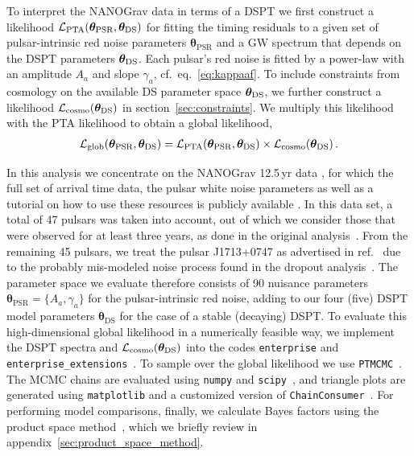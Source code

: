 To interpret the \ac{NANOGrav} data in terms of a \ac{DSPT} we first construct a likelihood $\mathcal{L}_\text{PTA}(\bm{\theta}_\text{PSR}, \bm{\theta}_{\text{DS}})$ for fitting the timing residuals to a given set of pulsar-intrinsic red noise parameters $\bm{\theta}_\text{PSR}$ and a \ac{GW} spectrum that depends on the \ac{DSPT} parameters $\bm{\theta}_{\text{DS}}$. Each pulsar's  red noise is fitted by a power-law with an amplitude $A_{a}$ and slope $\gamma_{a}$, cf.~eq.~\eqref{eq:kappaaf}. To include constraints from  cosmology on the available \ac{DS} parameter space $\bm{\theta}_{\text{DS}}$, we further construct a likelihood $\mathcal{L}_\text{cosmo}(\bm{\theta}_{\text{DS}})$ in section~\ref{sec:constraints}. We multiply this likelihood with the PTA 
likelihood to obtain a global likelihood,
\begin{align}
	\mathcal{L}_\text{glob}(\bm{\theta}_\text{PSR}, \bm{\theta}_\text{DS}) = \mathcal{L}_\text{PTA}(\bm{\theta}_\text{PSR}, \bm{\theta}_{\text{DS}}) \times \mathcal{L}_\text{cosmo}(\bm{\theta}_{\text{DS}}) \, . \label{eq:PTA_glob_lik}
\end{align}

In this analysis we concentrate on the \ac{NANOGrav} 12.5\,yr data \cite{NANOGrav:2020bcs}, for which the full set of arrival time data, the pulsar white noise parameters as well as a tutorial on how to use these resources is publicly available \cite{NANOGravTut}. In this data set, a total of 47 pulsars was taken into account, out of which we consider those that were observed for at least three years, as done in the original analysis~\cite{NANOGrav:2020bcs}. From the remaining 45 pulsars,  we treat the pulsar J1713+0747 as advertised in ref.~\cite{NANOGravTut} due to the probably mis-modeled noise process found in the dropout analysis~\cite{NANOGrav:2020bcs}. The parameter space we evaluate therefore consists of 90 nuisance parameters $\bm{\theta}_\text{PSR} =\{ A_a, \gamma_a\} $ for the pulsar-intrinsic red noise, adding to our four (five) \ac{DSPT} model parameters $\bm{\theta}_\text{DS}$ for the case of a stable (decaying) \ac{DSPT}. To evaluate this high-dimensional global likelihood in a numerically feasible way, we implement the \ac{DSPT} spectra and $\mathcal{L}_\text{cosmo}(\bm{\theta}_{\text{DS}})$ into the codes \texttt{enterprise} and \texttt{enterprise\_extensions}~\cite{enterprise, enterprise2}. To sample over the global likelihood we use \texttt{PTMCMC}~\cite{justin_ellis_2017_1037579}. The \ac{MCMC} chains are evaluated using \texttt{numpy} and \texttt{scipy}~\cite{Virtanen:2019joe}, and triangle plots are generated using \texttt{matplotlib} and a customized version of \texttt{ChainConsumer}~\cite{Hinton2016}. For performing model comparisons, finally, we calculate Bayes factors using the product space method~\cite{Hee:2015eba,10.2307/1391010, Chamberlin:2014ria, 10.2307/2346151}, which we briefly review in appendix~\ref{sec:product_space_method}.

